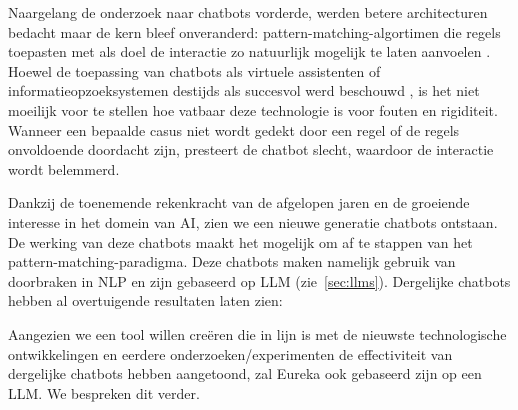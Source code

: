 Naargelang de onderzoek naar chatbots vorderde, werden betere architecturen bedacht maar de kern bleef onveranderd: pattern-matching-algortimen die regels toepasten met als doel de interactie zo natuurlijk mogelijk te laten aanvoelen \autocite{AbuShawar2007}. Hoewel de toepassing van chatbots als virtuele assistenten of informatieopzoeksystemen destijds als succesvol werd beschouwd \autocite{AbuShawar2007}, is het niet moeilijk voor te stellen hoe vatbaar deze technologie is voor fouten en rigiditeit. Wanneer een bepaalde casus niet wordt gedekt door een regel of de regels onvoldoende doordacht zijn, presteert de chatbot slecht, waardoor de interactie wordt belemmerd. 

Dankzij de toenemende rekenkracht van de afgelopen jaren en de groeiende interesse in het domein van \acrlong{AI}, zien we een nieuwe generatie chatbots ontstaan. De werking van deze chatbots maakt het mogelijk om af te stappen van het pattern-matching-paradigma. Deze chatbots maken namelijk gebruik van doorbraken in \acrfull{NLP} en zijn gebaseerd op \acrfull{LLM} (zie~\ref{sec:llms}). Dergelijke chatbots hebben al overtuigende resultaten laten zien:


Aangezien we een tool willen creëren die in lijn is met de nieuwste technologische ontwikkelingen en eerdere onderzoeken/experimenten de effectiviteit van dergelijke chatbots hebben aangetoond, zal Eureka ook gebaseerd zijn op een \acrshort{LLM}. We bespreken dit verder.

